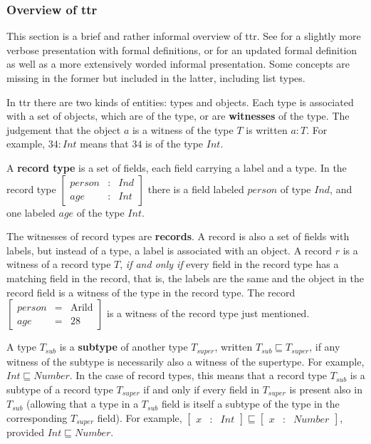 \subsubsection{Overview of \gls{ttr}}

This section is a brief and rather informal overview of \gls{ttr}.
See \cite{CooperTypetheorysemantics2012} for a slightly more verbose presentation with formal definitions, or \cite{CooperTypetheorylanguage2016} for an updated formal definition as well as a more extensively worded informal presentation.
Some concepts are missing in the former but included in the latter, including list types.

In \gls{ttr} there are two kinds of entities: types and objects.
Each type is associated with a set of objects, which are of the type, or are \textbf{witnesses} of the type.
The judgement that the object $a$ is a witness of the type $T$ is written $a : T$.
For example, $34 : Int$ means that $34$ is of the type $Int$.

A \textbf{record type} is a set of fields, each field carrying a label and a type.
In the record type $\left[ \begin{array}{rcl} person &:& Ind \\ age &:& Int \end{array} \right]$ there is a field labeled $person$ of type $Ind$, and one labeled $age$ of the type $Int$.

The witnesses of record types are \textbf{records}.
A record is also a set of fields with labels, but instead of a type, a label is associated with an object.
A record $r$ is a witness of a record type $T$, \textit{if and only if} every field in the record type has a matching field in the record, that is, the labels are the same and the object in the record field is a witness of the type in the record type.
The record $\left[ \begin{array}{rcl} person &=& \text{Arild} \\ age &=& 28 \end{array} \right]$ is a witness of the record type just mentioned.


A type $T_{sub}$ is a \textbf{subtype} of another type $T_{super}$, written $T_{sub} \sqsubseteq T_{super}$, if any witness of the subtype is necessarily also a witness of the supertype.
For example, $Int \sqsubseteq Number$.
In the case of record types, this means that a record type $T_{sub}$ is a subtype of a record type $T_{super}$ if and only if every field in $T_{super}$ is present also in $T_{sub}$ (allowing that a type in a $T_{sub}$ field is itself a subtype of the type in the corresponding $T_{super}$ field).
For example, $\left[ \begin{array}{rcl} x &:& Int \end{array} \right] \sqsubseteq \left[ \begin{array}{rcl} x &:& Number \end{array} \right]$, provided $Int \sqsubseteq Number$.


